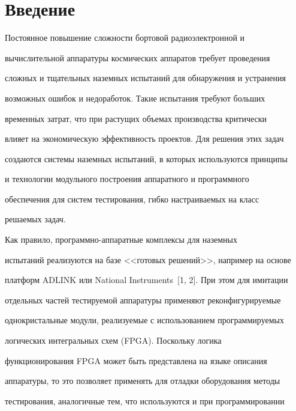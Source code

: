       \vspace*{-24pt}





    \section{Введение}





    Постоянное повышение сложности бортовой радиоэлектронной и


вычислительной аппаратуры космических аппаратов требует проведения


сложных и тщательных наземных испытаний для обнаружения и устранения


возможных ошибок и недоработок. Такие испытания требуют больших


временн$\acute{\mbox{ы}}$х затрат, что при растущих объемах производства критически


влияет на экономическую эффективность проектов. Для решения этих задач


создаются сис\-те\-мы наземных испытаний, в которых используются принципы


и технологии модульного построения аппаратного и программного


обеспечения для систем тестирования, гибко настраиваемых на класс


решаемых задач.





    Как правило, программно-аппаратные комплексы для наземных


испытаний реализуются на базе <<готовых решений>>, например на основе


платформ ADLINK или National Instruments~[1, 2]. При этом для имитации


отдельных частей тестируемой аппаратуры применяют реконфигурируемые


однокристальные модули, реализуемые с использованием программируемых


логических интегральных схем (FPGA). Поскольку логика


функционирования FPGA может быть представлена на языке описания


аппаратуры, то это позволяет применять для отладки оборудования методы


тестирования, аналогичные тем, что используются и при программировании


